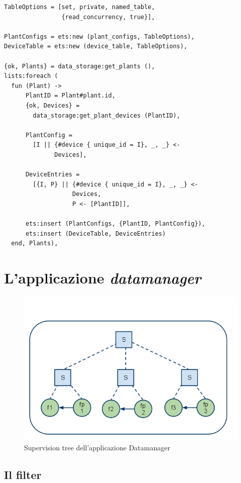 %
\begin{lstlisting}[caption={Costruzione delle tabelle \texttt{plant} e \texttt{device\_per\_plant}}, label={code:sysconf-conf-making},frame=trBL]
TableOptions = [set, private, named_table, 
                {read_concurrency, true}],

PlantConfigs = ets:new (plant_configs, TableOptions),
DeviceTable = ets:new (device_table, TableOptions),
    
{ok, Plants} = data_storage:get_plants (),
lists:foreach (
  fun (Plant) ->
      PlantID = Plant#plant.id,
      {ok, Devices} = 
        data_storage:get_plant_devices (PlantID),

      PlantConfig = 
        [I || {#device { unique_id = I}, _, _} <- 
              Devices],

      DeviceEntries = 
        [{I, P} || {#device { unique_id = I}, _, _} <-
                   Devices,
                   P <- [PlantID]],
	      
      ets:insert (PlantConfigs, {PlantID, PlantConfig}),
      ets:insert (DeviceTable, DeviceEntries)
  end, Plants),
\end{lstlisting}
%

%
\section{L'applicazione \emph{datamanager}}
%
\begin{figure}[!h]
\centering
\includegraphics[width=380pt]{img/datamanager.png}
\caption{Supervision tree dell'applicazione Datamanager}
\end{figure}
%
\subsection{Il filter}
